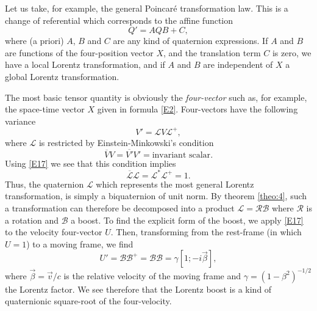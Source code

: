 \documentclass [12pt,a4paper      ]{article}
\newcommand{\CON}{\overline}          %
\begin{document}
     Let   us   take,   for   example,   the   general   Poincar\'e 
transformation  law.  This  is  a change  of  referential   which 
corresponds to the affine function
%
\begin{equation}\label{E16}
                         Q' = A Q B + C,               %
\end{equation}
%
where  (a  priori)  $A$, $B$ and $C$ are  any  kind  of  quaternion 
expressions. If  $A$ and $B$ are functions of the four-position vector $X$,  
and  the  translation term $C$ is zero,   we have a  local  Lorentz 
transformation,  and  if $A$ and $B$ are independent of $X$  
a  global Lorentz transformation.

     The  most  basic tensor quantity is obviously  the \emph{four-vector}  
such as,  for example,  the space-time vector $X$ given in  formula \eqref{E2}.  Four-vectors have the following variance
%
\begin{equation}\label{E17}
          V' = \mathcal{L} V \mathcal{L}^+ ,         %
\end{equation}
%
where $\mathcal{L}$ is restricted by Einstein-Minkowski's condition 
%
\begin{equation}\label{E18}
         \CON{V}V  = \CON{V'}V' = \text{invariant scalar}.   %
\end{equation}
%
Using \eqref{E17} we see that this condition implies
%
\begin{equation}\label{E19}
\CON{\mathcal{L}} \mathcal{L}= \mathcal{L}^* \mathcal{L}^+ = 1.  %
\end{equation}
% 
Thus, the quaternion $\mathcal{L}$ 
which  represents  the most general  Lorentz  transformation,  is 
simply  a  biquaternion  of unit norm.   By theorem  \ref{theo:4},  such  a 
transformation  can therefore be decomposed into a product
    $\mathcal{L} =\mathcal{R}\mathcal{B}$ where $\mathcal{R}$ 
is  a rotation and $\mathcal{B}$ a boost.   To find the explicit form of  the 
boost,   we  apply  \eqref{E17}  to  the  velocity  four-vector  $U$.   Then, 
transforming from the rest-frame (in which $U=1$) to a moving frame, 
we find
%
\begin{equation}\label{E20}
  U' = \mathcal{B} \mathcal{B}^+ =
       \mathcal{B} \mathcal{B}   = \gamma [1;-i\vec{\beta}], %
\end{equation}
%
where  $\vec{\beta} = \vec{v}/c$ is the relative velocity of the 
moving frame and 
$\gamma = (1 - \beta^2)^{-1/2}$ 
the Lorentz factor.   We see therefore that  the 
Lorentz  boost is a kind of quaternionic square-root of the 
four-velocity.
\end{document}
